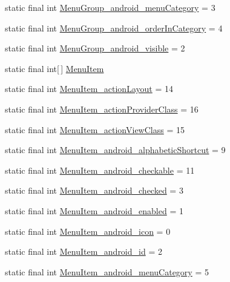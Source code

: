 \begin{DoxyCompactItemize}
\item 
static final int \hyperlink{classcheck_1_1test_1_1_r_1_1styleable_ab4abe6642c85e78a9af64e1d520a3856}{Menu\+Group\+\_\+android\+\_\+menu\+Category} = 3
\item 
static final int \hyperlink{classcheck_1_1test_1_1_r_1_1styleable_affb54491da972771b15dfc93ab8267f6}{Menu\+Group\+\_\+android\+\_\+order\+In\+Category} = 4
\item 
static final int \hyperlink{classcheck_1_1test_1_1_r_1_1styleable_a329149f9ef5c82c8f8ddfde35c9d9e05}{Menu\+Group\+\_\+android\+\_\+visible} = 2
\item 
static final int\mbox{[}$\,$\mbox{]} \hyperlink{classcheck_1_1test_1_1_r_1_1styleable_af26376072eab01d1b4197e48992dc936}{Menu\+Item}
\item 
static final int \hyperlink{classcheck_1_1test_1_1_r_1_1styleable_a1e6d157f94282edbc7543ea239b101bb}{Menu\+Item\+\_\+action\+Layout} = 14
\item 
static final int \hyperlink{classcheck_1_1test_1_1_r_1_1styleable_a1de7e291dacc4f22974c8384b8f76ee4}{Menu\+Item\+\_\+action\+Provider\+Class} = 16
\item 
static final int \hyperlink{classcheck_1_1test_1_1_r_1_1styleable_a66bbe255e93d07b1c2d98af7b85bcf37}{Menu\+Item\+\_\+action\+View\+Class} = 15
\item 
static final int \hyperlink{classcheck_1_1test_1_1_r_1_1styleable_a787aabf6b90e6e64c272388b5702e917}{Menu\+Item\+\_\+android\+\_\+alphabetic\+Shortcut} = 9
\item 
static final int \hyperlink{classcheck_1_1test_1_1_r_1_1styleable_a805d9eb8afc5f5884886c1cfd76c506f}{Menu\+Item\+\_\+android\+\_\+checkable} = 11
\item 
static final int \hyperlink{classcheck_1_1test_1_1_r_1_1styleable_a70f7214872e00bf3172089cd9d463d88}{Menu\+Item\+\_\+android\+\_\+checked} = 3
\item 
static final int \hyperlink{classcheck_1_1test_1_1_r_1_1styleable_a51ca1e5adfffb26576e59bc1610f9c6e}{Menu\+Item\+\_\+android\+\_\+enabled} = 1
\item 
static final int \hyperlink{classcheck_1_1test_1_1_r_1_1styleable_aa78bee5f32455dafa0a089ab87130bc1}{Menu\+Item\+\_\+android\+\_\+icon} = 0
\item 
static final int \hyperlink{classcheck_1_1test_1_1_r_1_1styleable_a59b9e4a6fb4718026e0941ce96cbb5b6}{Menu\+Item\+\_\+android\+\_\+id} = 2
\item 
static final int \hyperlink{classcheck_1_1test_1_1_r_1_1styleable_a0fe0f490126cfec187176b2dd0855360}{Menu\+Item\+\_\+android\+\_\+menu\+Category} = 5

\end{DoxyCompactItemize}
